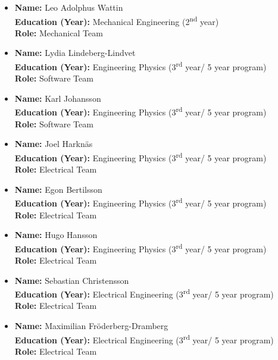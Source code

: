 \begin{itemize}
    \item \textbf{Name:} Leo Adolphus Wattin \\
    \textbf{Education (Year):} Mechanical Engineering (2\textsuperscript{nd} year) \\
    \textbf{Role:} Mechanical Team

    \item \textbf{Name:} Lydia Lindeberg-Lindvet \\
    \textbf{Education (Year):} Engineering Physics (3\textsuperscript{rd} year/ 5 year program) \\
    \textbf{Role:} Software Team

    \item \textbf{Name:} Karl Johansson \\
    \textbf{Education (Year):} Engineering Physics (3\textsuperscript{rd} year/ 5 year program) \\
    \textbf{Role:} Software Team

    \item \textbf{Name:} Joel Harknäs \\
    \textbf{Education (Year):} Engineering Physics (3\textsuperscript{rd} year/ 5 year program) \\
    \textbf{Role:} Electrical Team

    \item \textbf{Name:} Egon Bertilsson \\
    \textbf{Education (Year):} Engineering Physics (3\textsuperscript{rd} year/ 5 year program) \\
    \textbf{Role:} Electrical Team

    \item \textbf{Name:} Hugo Hansson \\
    \textbf{Education (Year):} Engineering Physics (3\textsuperscript{rd} year/ 5 year program) \\
    \textbf{Role:} Electrical Team

    \item \textbf{Name:} Sebastian Christensson \\
    \textbf{Education (Year):} Electrical Engineering (3\textsuperscript{rd} year/ 5 year program) \\
    \textbf{Role:} Electrical Team

    \item \textbf{Name:} Maximilian Fröderberg-Dramberg \\
    \textbf{Education (Year):} Electrical Engineering (3\textsuperscript{rd} year/ 5 year program) \\
    \textbf{Role:} Electrical Team


\end{itemize}
